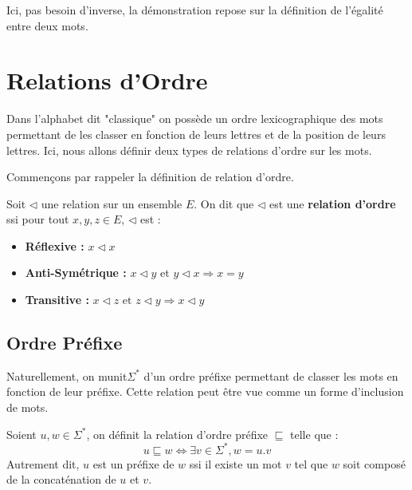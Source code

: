 Ici, pas besoin d'inverse, la démonstration repose sur la définition de l'égalité entre deux mots. 



\section{Relations d'Ordre}

Dans l'alphabet dit "classique" on possède un ordre lexicographique des mots permettant de les classer 
en fonction de leurs lettres et de la position de leurs lettres. 
Ici, nous allons définir deux types de relations d'ordre sur les mots. 

Commençons par rappeler la définition de relation d'ordre. 

\begin{definition}
    Soit $\lhd $ une relation sur un ensemble $E$. On dit que $\lhd$ est une \textbf{relation d'ordre} ssi 
    pour tout $x,y,z \in E$, $\lhd$ est :
    \begin{itemize}
        \item \textbf{Réflexive : } $ x \lhd x $ 
        \item \textbf{Anti-Symétrique : } $ x \lhd y \text{ et } y \lhd x \Longrightarrow x = y $ 
        \item \textbf{Transitive : } $x \lhd z \text{ et } z \lhd y \Longrightarrow x \lhd y $ 
    \end{itemize}
\end{definition}

\subsection{Ordre Préfixe}

Naturellement, on munit$ \Sigma^*$ d'un ordre préfixe permettant de classer les mots en fonction de leur préfixe. 
Cette relation peut être vue comme un forme d'inclusion de mots. 

\begin{definition}
    Soient $u,w \in \Sigma^*$, on définit la relation d'ordre préfixe $\sqsubseteq$ telle que :
        \[ \boxed{u \sqsubseteq w \iff \exists v \in \Sigma^*, w = u.v} \] 
    Autrement dit, $u$ est un préfixe de $w$ ssi il existe un mot $v$ tel que $w$ soit composé de 
    la concaténation de $u$ et $v$. 
\end{definition}

